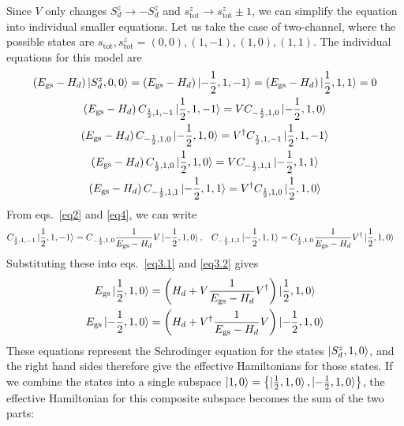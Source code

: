 \documentclass[12pt]{revtex4-2}
\begin{document}
Since \(V\) only changes \(S_d^z \to -S_d^z\) and \(s^z_\text{tot} \to s^z_\text{tot} \pm 1\), we can simplify the equation into individual smaller equations. Let us take the case of two-channel, where the possible states are \(s_\text{tot},s^z_\text{tot} = (0,0), (1,-1), (1,0), (1,1)\). The individual equations for this model are
\begin{gather}
	\left(E_\text{gs} - H_d\right) \ket{S_d^z, 0, 0} = \left(E_\text{gs} - H_d\right) \ket{-\frac{1}{2}, 1, -1} = \left(E_\text{gs} - H_d\right) \ket{\frac{1}{2}, 1, 1}  = 0 \label{no_V}\\
	\left(E_\text{gs} - H_d\right) C_{\frac{1}{2}, 1, -1}\ket{\frac{1}{2}, 1, -1} = V C_{-\frac{1}{2}, 1, 0}\ket{-\frac{1}{2}, 1, 0}\label{eq2}\\
	\left(E_\text{gs} - H_d\right) C_{-\frac{1}{2}, 1, 0}\ket{-\frac{1}{2}, 1, 0} = V^\dagger C_{\frac{1}{2}, 1, -1}\ket{\frac{1}{2}, 1, -1}\label{eq3.2}\\
	\left(E_\text{gs} - H_d\right) C_{\frac{1}{2}, 1, 0}\ket{\frac{1}{2}, 1, 0} = V C_{-\frac{1}{2}, 1, 1}\ket{-\frac{1}{2}, 1, 1} \label{eq3.1}\\
	\left(E_\text{gs} - H_d\right) C_{-\frac{1}{2}, 1, 1}\ket{-\frac{1}{2}, 1, 1} = V^\dagger C_{\frac{1}{2}, 1, 0}\ket{\frac{1}{2}, 1, 0}\label{eq4}
\end{gather}
From eqs.~\ref{eq2} and \ref{eq4}, we can write
\begin{align}
	C_{\frac{1}{2}, 1, -1}\ket{\frac{1}{2}, 1, -1} &= C_{-\frac{1}{2}, 1, 0}\frac{1}{E_\text{gs} - H_d}V \ket{-\frac{1}{2}, 1, 0}, &&C_{-\frac{1}{2}, 1, 1}\ket{-\frac{1}{2}, 1, 1} = C_{\frac{1}{2}, 1, 0}\frac{1}{E_\text{gs} - H_d}V^\dagger \ket{\frac{1}{2}, 1, 0}
\end{align}
Substituting these into eqs.~\ref{eq3.1} and \ref{eq3.2} gives 
\begin{align}
	\label{eff_ham_Sdz_10}
	E_\text{gs} \ket{\frac{1}{2}, 1, 0} &= \left(H_d + V \frac{1}{E_\text{gs} - H_d}V^\dagger\right) \ket{\frac{1}{2}, 1, 0}\\
	E_\text{gs} \ket{-\frac{1}{2}, 1, 0} &= \left(H_d + V^\dagger \frac{1}{E_\text{gs} - H_d} V\right) \ket{-\frac{1}{2}, 1, 0}\\
\end{align}
These equations represent the Schrodinger equation for the states \(\ket{S_d^z, 1, 0}\), and the right hand sides therefore give the effective Hamiltonians for those states. If we combine the states into a single subspace \(\ket{1,0}= \left\{\ket{\frac{1}{2}, 1, 0}, \ket{-\frac{1}{2}, 1, 0}\right\}\), the effective Hamiltonian for this composite subspace becomes the sum of the two parts:
\end{document}
